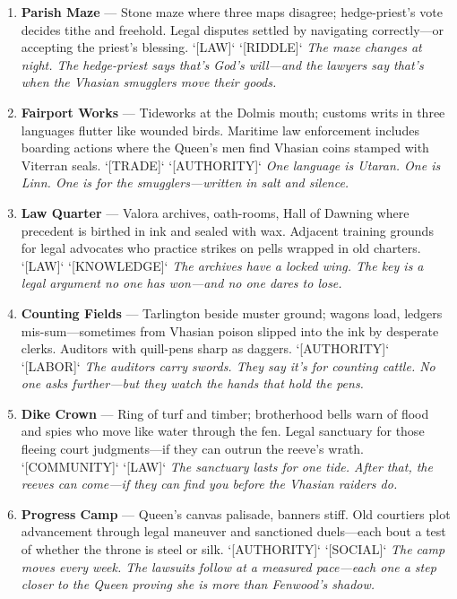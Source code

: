 \begin{enumerate}
  \hfill \textit{The forge-reeve has never lost a contract. His opponents have a habit of vanishing the night before the bid---leaving only their seals behind, still warm.}
\item \textbf{Parish Maze} --- Stone maze where three maps disagree; hedge-priest's vote decides tithe and freehold. Legal disputes settled by navigating correctly---or accepting the priest's blessing. `[LAW]` `[RIDDLE]`
  \hfill \textit{The maze changes at night. The hedge-priest says that's God's will---and the lawyers say that's when the Vhasian smugglers move their goods.}
\item \textbf{Fairport Works} --- Tideworks at the Dolmis mouth; customs writs in three languages flutter like wounded birds. Maritime law enforcement includes boarding actions where the Queen's men find Vhasian coins stamped with Viterran seals. `[TRADE]` `[AUTHORITY]`
  \hfill \textit{One language is Utaran. One is Linn. One is for the smugglers---written in salt and silence.}
\item \textbf{Law Quarter} --- Valora archives, oath-rooms, Hall of Dawning where precedent is birthed in ink and sealed with wax. Adjacent training grounds for legal advocates who practice strikes on pells wrapped in old charters. `[LAW]` `[KNOWLEDGE]`
  \hfill \textit{The archives have a locked wing. The key is a legal argument no one has won---and no one dares to lose.}
\item \textbf{Counting Fields} --- Tarlington beside muster ground; wagons load, ledgers mis-sum---sometimes from Vhasian poison slipped into the ink by desperate clerks. Auditors with quill-pens sharp as daggers. `[AUTHORITY]` `[LABOR]`
  \hfill \textit{The auditors carry swords. They say it's for counting cattle. No one asks further---but they watch the hands that hold the pens.}
\item[J] \textbf{Dike Crown} --- Ring of turf and timber; brotherhood bells warn of flood and spies who move like water through the fen. Legal sanctuary for those fleeing court judgments---if they can outrun the reeve's wrath. `[COMMUNITY]` `[LAW]`
  \hfill \textit{The sanctuary lasts for one tide. After that, the reeves can come---if they can find you before the Vhasian raiders do.}
\item[Q] \textbf{Progress Camp} --- Queen's canvas palisade, banners stiff. Old courtiers plot advancement through legal maneuver and sanctioned duels---each bout a test of whether the throne is steel or silk. `[AUTHORITY]` `[SOCIAL]`
  \hfill \textit{The camp moves every week. The lawsuits follow at a measured pace---each one a step closer to the Queen proving she is more than Fenwood's shadow.}

\end{enumerate}
